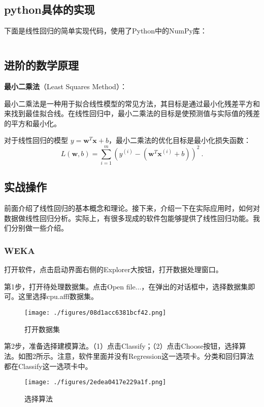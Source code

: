 \subsection{python具体的实现}
下面是线性回归的简单实现代码，使用了Python中的NumPy库：
\begin{lstlisting}[language=python]

\end{lstlisting}

\subsection{进阶的数学原理}
\textbf{最小二乘法}（Least Squares Method）：

最小二乘法是一种用于拟合线性模型的常见方法，其目标是通过最小化残差平方和来找到最佳拟合线。在线性回归中，最小二乘法的目标是使预测值与实际值的残差的平方和最小化。

对于线性回归的模型 $y = \mathbf{w}^T \mathbf{x} + b$，最小二乘法的优化目标是最小化损失函数：
\begin{equation}
L(\mathbf{w}, b) = \sum_{i=1}^{m} (y^{(i)} - (\mathbf{w}^T \mathbf{x}^{(i)} + b))^2~.
\end{equation}


\subsection{实战操作}

前面介绍了线性回归的基本概念和理论。接下来，介绍一下在实际应用时，如何对数据做线性回归分析。实际上，有很多现成的软件包能够提供了线性回归功能。我们分别做一些介绍。

\subsubsection{WEKA}


打开软件，点击启动界面右侧的Explorer大按钮，打开数据处理窗口。

第1步，打开待处理数据集。点击Open file...，在弹出的对话框中，选择数据集即可。这里选择cpu.afff数据集。
\begin{figure}[ht]
\centering
\texttt{[image: ./figures/08d1acc6381bcf42.png]}
\caption{打开数据集} \label{fig_LiGr_5}
\end{figure}

第2步，准备选择建模算法。（1）点击Classify；（2）点击Choose按钮，选择算法。如图2所示。注意，软件里面并没有Regression这一选项卡。分类和回归算法都在Classify这一选项卡中。
\begin{figure}[ht]
\centering
\texttt{[image: ./figures/2edea0417e229a1f.png]}
\caption{选择算法} \label{fig_LiGr_2}
\end{figure}

